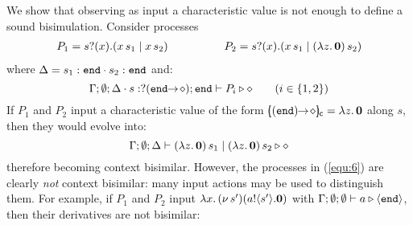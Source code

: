 \begin{example}
	\label{ex:motivation}
	We show that observing as input
	a characteristic value
	is not enough
	to define a sound bisimulation.
	Consider   processes %
%
	\begin{eqnarray}
		P_1 = s ? (x) . (x\, {s_1} \;|\; x\, {s_2}) 
		&\qquad \qquad& 
		P_2 = s ? (x) . (x\, {s_1} \;|\; (\lambda z.\,\mathbf{0})\, {s_2}) 
		\label{equ:6}
	\end{eqnarray}
%
%
%
%
	where $\Delta = s_1: \mathtt{end} \cdot s_2: \mathtt{end}$ and:
%
	\[
		\Gamma; \emptyset; \Delta \cdot s: ? (\mathtt{end}\!\! \rightarrow\! \diamond) ; \mathtt{end} \vdash P_i \triangleright \diamond \qquad (i \in \{1,2\})
	\]
%
	If $P_1$ and $P_2$ input 
	a characteristic value of the form
	$[\!\!((\mathtt{end})\!\! \rightarrow\! \diamond)\!\!]_{\mathsf{c}} = \lambda z.\,\mathbf{0}$
	along $s$, then they would evolve into:
%
%
%
	\[
		\Gamma; \emptyset; \Delta \vdash (\lambda z.\,\mathbf{0})\, {s_1} \;|\; (\lambda z.\,\mathbf{0})\, {s_2} \triangleright \diamond
	\]
%
	\noi therefore becoming context bisimilar.
	However, the processes in (\ref{equ:6}) 
	are clearly {\em not} context bisimilar: many input actions
	may be used to distinguish them.
	For example, if  $P_1$ and $P_2$ input
%
%
	$\lambda x.\,(\nu\, s')(a ! \langle s' \rangle . \mathbf{0})$
	with
%
	$\Gamma; \emptyset; \emptyset \vdash a \triangleright \langle \mathtt{end} \rangle$,
%
	then their derivatives are not bisimilar:
%

\end{example}
